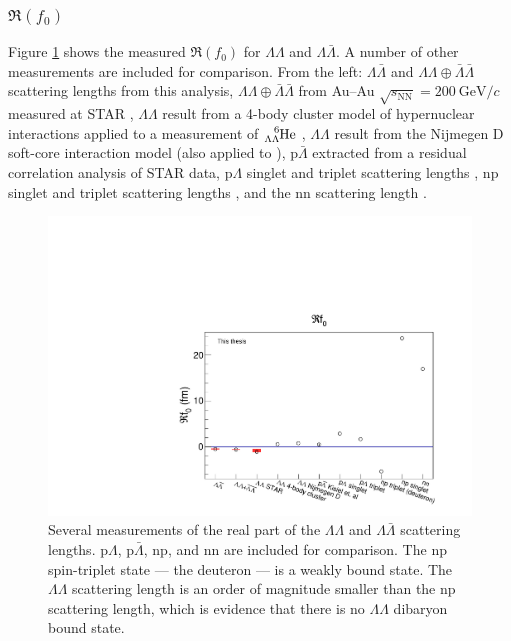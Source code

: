 


\subsubsection{$\Re(f_0)$}
\label{sec:Ref0Result}


Figure \ref{fig:Ref0} shows the measured $\Re(f_0)$ for $\Lambda\Lambda$ and $\Lambda\bar{\Lambda}$. A number of other measurements are included for comparison. From the left: $\Lambda\bar{\Lambda}$ and $\Lambda\Lambda \oplus \bar{\Lambda}\bar{\Lambda}$ scattering lengths from this analysis, $\Lambda\Lambda \oplus \bar{\Lambda}\bar{\Lambda}$ from Au--Au $\sqrt{s_{\mathrm{NN}}} = 200\ \mathrm{GeV}/c$ measured at STAR \cite{Adamczyk:2014vca}, $\Lambda\Lambda$ result from a 4-body cluster model of hypernuclear interactions \cite{Hiyama:2002yj} applied to a measurement of $\ce{^{6}_{\Lambda\Lambda}\mathrm{He}}$ \cite{Takahashi:2001nm}, $\Lambda\Lambda$ result from the Nijmegen D soft-core interaction model \cite{Filikhin:2002wm} (also applied to \cite{Hiyama:2002yj}), $\mathrm{p}\bar{\Lambda}$ extracted from a residual correlation analysis \cite{Kisiel:2014mma} of STAR data, $\mathrm{p}\Lambda$ singlet and triplet scattering lengths \cite{Wang:1999bf}, np singlet and triplet scattering lengths \cite{LANDAU1977502}, and the nn scattering length \cite{vonWitsch:1979uni}.

\begin{figure}[hbtp]
\includegraphics[width=36pc]{Figures/FitResults/2016-10-12-Ref0.pdf}
\caption[Measurements of $\Re(f_0)$ for various particle pairs]{Several measurements of the real part of the $\Lambda\Lambda$ and $\Lambda\bar{\Lambda}$ scattering lengths. p$\Lambda$, p$\bar{\Lambda}$, np, and nn are included for comparison. The np spin-triplet state --- the deuteron --- is a weakly bound state. The $\Lambda\Lambda$ scattering length is an order of magnitude smaller than the np scattering length, which is evidence that there is no $\Lambda\Lambda$ dibaryon bound state.}
\label{fig:Ref0}
\end{figure}

